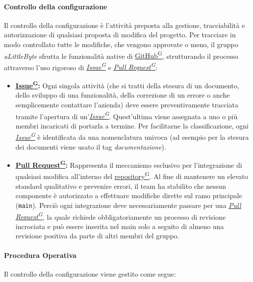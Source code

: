 \documentclass[a4paper,12pt]{article}
\providecommand{\glslink}[2]{\href{https://alittlebyte-19.github.io/Documentazione/glossario.html\#gls-#1}{\underline{#2}\textsuperscript{\scriptsize G}}}
\begin{document}
\paragraph{Controllo della configurazione}

Il controllo della configurazione è l'attività preposta alla gestione, tracciabilità e autorizzazione di qualsiasi proposta di modifica del progetto. Per tracciare in modo controllato tutte le modifiche, che vengono approvate o meno, il gruppo \textit{aLittleByte} sfrutta le funzionalità native di \glslink{github}{GitHub}, strutturando il processo attraverso l'uso rigoroso di \textit{\glslink{issue}{Issue}} e \textit{\glslink{pull-request}{Pull Request}}:

\begin{itemize}
    \item \textbf{\glslink{issue}{Issue}:} Ogni singola attività (che si tratti della stesura di un documento, dello sviluppo di una funzionalità, della correzione di un errore o anche semplicemente contattare l'azienda) deve essere preventivamente tracciata tramite l'apertura di un'\textit{\glslink{issue}{Issue}}. Quest'ultima viene assegnata a uno o più membri incaricati di portarla a termine. Per facilitarne la classificazione, ogni \textit{\glslink{issue}{Issue}} è identificata da una nomenclatura univoca (ad esempio per la stesura dei documenti viene usato il tag \textit{documentazione}).
    
    \item \textbf{\glslink{pull-request}{Pull Request}:} Rappresenta il meccanismo esclusivo per l'integrazione di qualsiasi modifica all'interno del \glslink{repository}{repository}. Al fine di mantenere un elevato standard qualitativo e prevenire errori, il team ha stabilito che nessun componente è autorizzato a effettuare modifiche dirette sul ramo principale (\texttt{main}). Perciò ogni integrazione deve necessariamente passare per una \textit{\glslink{pull-request}{Pull Request}}, la quale richiede obbligatoriamente un processo di revisione incrociata e può essere inserita nel main solo a seguito di almeno una revisione positiva da parte di altri membri del gruppo. 
\end{itemize}

\paragraph{Procedura Operativa}
Il controllo della configurazione viene gestito come segue:
\end{document}
